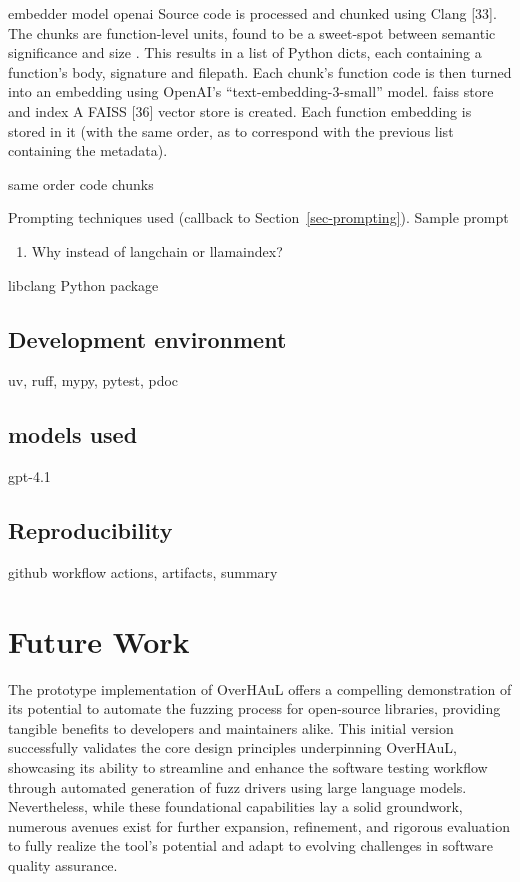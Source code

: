 \documentclass[
  a4paper,
  DIV=11,
  numbers=noendperiod]{scrreprt}
\providecommand{\tightlist}{%
  \setlength{\itemsep}{0pt}\setlength{\parskip}{0pt}}
\theoremstyle{definition}
\theoremstyle{remark}
\begin{document}
embedder model openai Source code is processed and chunked using Clang
{[}33{]}. The chunks are function-level units, found to be a sweet-spot
between semantic significance and size \autocite{zhao2024,chen2021}.
This results in a list of Python dicts, each containing a function's
body, signature and filepath. Each chunk's function code is then turned
into an embedding using OpenAI's ``text-embedding-3-small'' model. faiss
store and index A FAISS {[}36{]} vector store is created. Each function
embedding is stored in it (with the same order, as to correspond with
the previous list containing the metadata).

same order code chunks

Prompting techniques used (callback to Section~\ref{sec-prompting}).
Sample prompt

\autocite{dspy}

\begin{enumerate}
\def\labelenumi{\arabic{enumi}.}
\tightlist
\item
  Why instead of langchain or llamaindex?
  \autocite{langchain,llamaindex}
\end{enumerate}

libclang Python package

\section{Development environment}\label{development-environment}

uv, ruff, mypy, pytest, pdoc

\section{models used}\label{models-used}

gpt-4.1

\section{Reproducibility}\label{reproducibility}

github workflow actions, artifacts, summary


\chapter{Future Work}\label{future-work}

The prototype implementation of OverHAuL offers a compelling
demonstration of its potential to automate the fuzzing process for
open-source libraries, providing tangible benefits to developers and
maintainers alike. This initial version successfully validates the core
design principles underpinning OverHAuL, showcasing its ability to
streamline and enhance the software testing workflow through automated
generation of fuzz drivers using large language models. Nevertheless,
while these foundational capabilities lay a solid groundwork, numerous
avenues exist for further expansion, refinement, and rigorous evaluation
to fully realize the tool's potential and adapt to evolving challenges
in software quality assurance.
\end{document}
